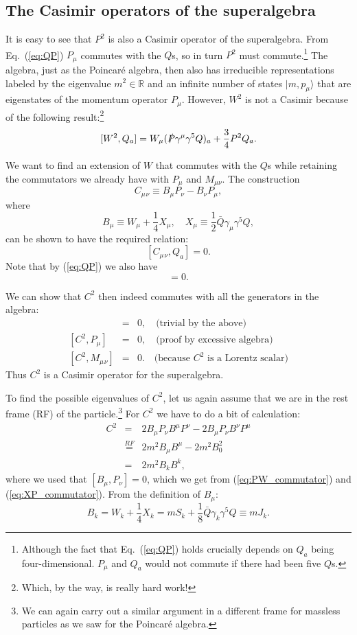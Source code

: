 \documentclass[notes.tex]{subfiles}
\begin{document}
\subsection{The Casimir operators of the superalgebra}
It is easy to see that $P^2$ is also a Casimir operator of the superalgebra. From Eq.~(\ref{eq:QP}) $P_\mu$ commutes with the $Q$s, so in turn $P^2$ must commute.\footnote{Although the fact that Eq.~(\ref{eq:QP}) holds crucially depends on $Q_a$ being four-dimensional. $P_\mu$ and $Q_a$ would not commute if there had been five $Q$s.} 
The algebra, just as the Poincaré algebra, then also has irreducible representations labeled by the eigenvalue $m^2\in\mathbb R$ and an infinite number of states $|m,p_\mu\rangle$ that are eigenstates of the momentum operator $P_\mu$.
However, $W^2$ is not a Casimir because of the following result:\footnote{Which, by the way, is really hard work!}
\[[W^2, Q_a] = W_\mu(\slashed{P}\gamma^\mu \gamma^5 Q)_a + \frac{3}{4}P^2 Q_a.\]

We want to find an extension of $W$ that commutes with the $Q$s while retaining the commutators we already have with $P_\mu$ and $M_{\mu\nu}$. The construction
\[C_\mu{}_\nu \equiv B_\mu P_\nu - B_\nu P_\mu,\]
where
\[B_\mu \equiv W_\mu + \frac{1}{4} X_\mu,\quad X_\mu \equiv \frac{1}{2} \bar{Q}\gamma_\mu \gamma^5 Q,\]
can be shown to have the required relation:
\[[C_\mu{}_\nu, Q_a] = 0.\]
Note that by (\ref{eq:QP}) we also have 
\begin{equation}
[X_\mu,P_\nu]=0.
\label{eq:XP_commutator}
\end{equation}

We can show that $C^2$ then indeed commutes with all the generators in the algebra:
\begin{eqnarray*}
[C^2, Q_a] &=& 0, \quad\text{(trivial by the above)}\\
{}[C^2, P_\mu] &=& 0, \quad\text{(proof by excessive algebra)}\\
{}[C^2, M_\mu{}_\nu] &=& 0. \quad\text{(because $C^2$ is a Lorentz scalar)}
\end{eqnarray*}
Thus $C^2$ is a Casimir operator for the superalgebra.

To find the possible eigenvalues of $C^2$, let us again assume that we are in the rest frame (RF) of the particle.\footnote{We can again carry out a similar argument in a different frame for massless particles as we saw for the Poincaré algebra.} For $C^2$ we have to do a bit of calculation:
\begin{eqnarray*}
C^2 &=& 2B_\mu P_\nu B^\mu P^\nu - 2B_\mu P_\nu B^\nu P^\mu\\
&\stackrel{RF}{=}& 2m^2 B_\mu B^\mu - 2m^2 B_0^2\\
&=& 2m^2 B_k B^k,
\end{eqnarray*}
where we used that $[B_\mu,P_\nu]=0$, which we get from  (\ref{eq:PW_commutator}) and (\ref{eq:XP_commutator}). From the definition of $B_\mu$:
\begin{equation}
B_k = W_k + \frac{1}{4}X_k = mS_k + \frac{1}{8}\bar{Q}\gamma_k \gamma^5 Q \equiv m J_k.
\label{eq:def_Jk}
\end{equation}
\end{document}

